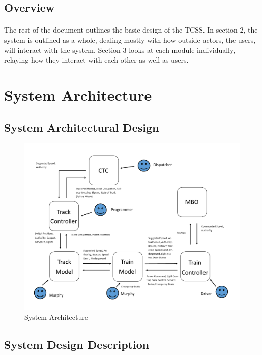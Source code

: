 \documentclass{article}
\begin{document}
    \subsection{Overview}
    \paragraph{}
    The rest of the document outlines the basic design of the TCSS. In section 2, the system is outlined as a whole, dealing mostly with how outside actors, the users, will interact with the system. Section 3 looks at each module individually, relaying how they interact with each other as well as users.

\section{System Architecture}
    
    \subsection{System Architectural Design}
    \begin{figure}[H]
        \centering
        \includegraphics[width=\textwidth]{./System/Architecture Diagram.png}
        \caption{System Architecture}
        \label{fig:system_architecture}
    \end{figure}
    
    \subsection{System Design Description}
    
\end{document}
